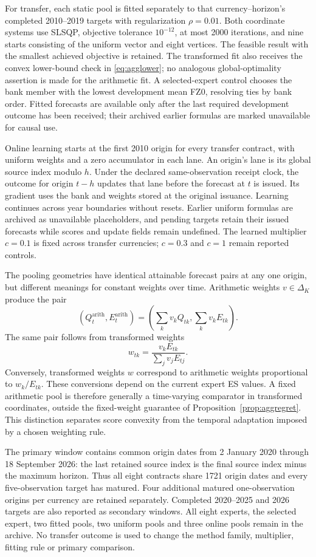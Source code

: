 \documentclass[11pt,a4paper]{article}
\theoremstyle{definition}\newtheorem{definition}[theorem]{Definition}
\begin{document}
For transfer, each static pool is fitted separately to that currency--horizon's completed 2010--2019 targets with regularization $\rho=0.01$. Both coordinate systems use SLSQP, objective tolerance $10^{-12}$, at most 2000 iterations, and nine starts consisting of the uniform vector and eight vertices. The feasible result with the smallest achieved objective is retained. The transformed fit also receives the convex lower-bound check in \eqref{eq:agglower}; no analogous global-optimality assertion is made for the arithmetic fit. A selected-expert control chooses the bank member with the lowest development mean FZ0, resolving ties by bank order. Fitted forecasts are available only after the last required development outcome has been received; their archived earlier formulas are marked unavailable for causal use.

Online learning starts at the first 2010 origin for every transfer contract, with uniform weights and a zero accumulator in each lane. An origin's lane is its global source index modulo $h$. Under the declared same-observation receipt clock, the outcome for origin $t-h$ updates that lane before the forecast at $t$ is issued. Its gradient uses the bank and weights stored at the original issuance. Learning continues across year boundaries without resets. Earlier uniform formulas are archived as unavailable placeholders, and pending targets retain their issued forecasts while scores and update fields remain undefined. The learned multiplier $c=0.1$ is fixed across transfer currencies; $c=0.3$ and $c=1$ remain reported controls.

The pooling geometries have identical attainable forecast pairs at any one origin, but different meanings for constant weights over time. Arithmetic weights $v\in\Delta_K$ produce the pair
\[
 (Q_t^{\mathrm{arith}},E_t^{\mathrm{arith}})=(\sum_kv_kQ_{tk},\sum_kv_kE_{tk}).
\] The same pair follows from transformed weights
\[
 w_{tk}=\frac{v_kE_{tk}}{\sum_jv_jE_{tj}}.
\]
Conversely, transformed weights $w$ correspond to arithmetic weights proportional to $w_k/E_{tk}$. These conversions depend on the current expert ES values. A fixed arithmetic pool is therefore generally a time-varying comparator in transformed coordinates, outside the fixed-weight guarantee of Proposition~\ref{prop:aggregret}. This distinction separates score convexity from the temporal adaptation imposed by a chosen weighting rule.

The primary window contains common origin dates from 2 January 2020 through 18 September 2026: the last retained source index is the final source index minus the maximum horizon. Thus all eight contracts share 1721 origin dates and every five-observation target has matured. Four additional matured one-observation origins per currency are retained separately. Completed 2020--2025 and 2026 targets are also reported as secondary windows. All eight experts, the selected expert, two fitted pools, two uniform pools and three online pools remain in the archive. No transfer outcome is used to change the method family, multiplier, fitting rule or primary comparison.
\end{document}
